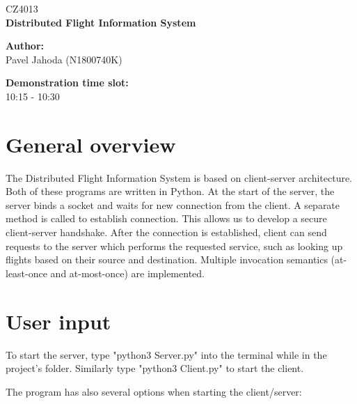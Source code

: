 \documentclass[12pt,a4paper]{article}
\begin{document}
\begin{titlepage}
  \thispagestyle{fancy}

  \vspace*{\fill}
  \begin{center}
    {\fontsize{20}{30}\selectfont CZ4013}\\[1cm]
    {\fontsize{30}{100}\selectfont \textbf{Distributed Flight Information System}}\\[4.2cm]
  \end{center}

  \vspace*{\fill}

  {\fontsize{10}{10} \selectfont \noindent
  \textbf{Author:}\\
  Pavel Jahoda (N1800740K)
  }

  {\fontsize{10}{10} \selectfont \noindent
  \textbf{Demonstration time slot:}\\
    10:15 - 10:30
  }
\end{titlepage}

\renewcommand{\headrulewidth}{0.4pt}
\renewcommand{\footrulewidth}{0.4pt}


\tableofcontents

\newpage


\section{General overview}
The Distributed Flight Information System is based on client-server architecture. Both of these programs are written in Python. At the start of the server, the server binds a socket and waits for new connection from the client. A separate method is called to establish connection. This allows us to develop a secure client-server handshake. After the connection is established, client can send requests to the server which performs the requested service, such as looking up flights based on their source and destination. Multiple invocation semantics (at-least-once and at-most-once) are implemented.

\section{User input}
To start the server, type "python3 Server.py" into the terminal while in the project's folder. Similarly type "python3 Client.py" to start the client.\par \medskip
The program has also several options when starting the client/server:
\end{document}
